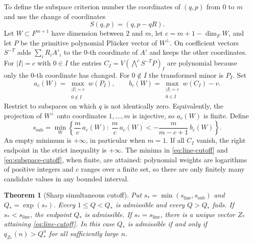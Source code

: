 \documentclass[11pt,a4paper,reqno]{amsart}
\newtheorem{theorem}{Theorem}[section]
\theoremstyle{definition}
\theoremstyle{remark}
\numberwithin{equation}{section}
\begin{document}
To define the subspace criterion number the coordinates of
\((q,p)\) from \(0\) to \(m\) and use the change of coordinates
\[
 S(q,p)=(q,p-qR).
\]
Let \(W\subset F^{m+1}\) have dimension between \(2\) and \(m\), let
\(c=m+1-\dim_F W\), and let \(P\) be the primitive polynomial
Pl\"ucker vector of \(W^\perp\). On coefficient vectors \(S^{-T}\)
adds \(\sum_i R_i A'_i\) to the \(0\)-th coordinate of \(A'\) and
keeps the other coordinates. For \(|I|=c\) with \(0\in I\) the
entries \(C_I=V(\bigwedge^c S^{-T}P)_I\) are polynomial because
only the \(0\)-th coordinate has changed. For \(0\notin I\) the
transformed minor is \(P_I\).
Set
\begin{equation}\label{eq:subspace-weights}
 a_c(W)=\max_{\substack{|I|=c\\0\notin I}} w(P_I),\qquad
 b_c(W)=\max_{\substack{|I|=c\\0\in I}} w(C_I)-v .
\end{equation}
Restrict to subspaces on which \(q\) is not identically zero.
Equivalently, the projection of \(W^\perp\) onto coordinates
\(1,\ldots,m\) is injective, so \(a_c(W)\) is finite.
Define
\begin{equation}\label{eq:subspace-cutoff}
 s_{\mathrm{sub}}=\min_W
 \left\{\frac m c\,a_c(W):\
   \frac m c\,a_c(W)<-\frac{m}{m-c+1}\,b_c(W)\right\}.
\end{equation}
An empty minimum is \(+\infty\), in particular when \(m=1\).
If all \(C_I\) vanish, the right endpoint in the strict
inequality is \(+\infty\).
The minima in \eqref{eq:line-cutoff} and \eqref{eq:subspace-cutoff},
when finite, are attained: polynomial weights are logarithms of
positive integers and \(c\) ranges over a finite set, so there
are only finitely many candidate values in any bounded interval.

\begin{theorem}[Sharp simultaneous cutoff]\label{thm:simcut}
Put \(s_*=\min(s_{\mathrm{line}},s_{\mathrm{sub}})\) and
\(Q_*=\exp(s_*)\).
Every \(1\le Q<Q_*\) is admissible and every \(Q>Q_*\) fails.
If \(s_*<s_{\mathrm{line}}\), the endpoint \(Q_*\) is admissible.
If \(s_*=s_{\mathrm{line}}\), there is a unique vector \(Z_*\)
attaining \eqref{eq:line-cutoff}. In this case \(Q_*\) is admissible
if and only if \(q_{Z_*}(n)>Q_*^n\) for all sufficiently large \(n\).
\end{theorem}
\end{document}

